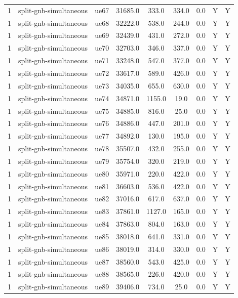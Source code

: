 \begin{table}[ht]
\begin{tabular}{|c|c|c|c|c|c|c|c|c|}
1 & split-gnb-simultaneous & ue67 & 31685.0 & 333.0 & 334.0 & 0.0 & Y & Y \\
1 & split-gnb-simultaneous & ue68 & 32222.0 & 538.0 & 244.0 & 0.0 & Y & Y \\
1 & split-gnb-simultaneous & ue69 & 32439.0 & 431.0 & 272.0 & 0.0 & Y & Y \\
1 & split-gnb-simultaneous & ue70 & 32703.0 & 346.0 & 337.0 & 0.0 & Y & Y \\
1 & split-gnb-simultaneous & ue71 & 33248.0 & 547.0 & 377.0 & 0.0 & Y & Y \\
1 & split-gnb-simultaneous & ue72 & 33617.0 & 589.0 & 426.0 & 0.0 & Y & Y \\
1 & split-gnb-simultaneous & ue73 & 34035.0 & 655.0 & 630.0 & 0.0 & Y & Y \\
1 & split-gnb-simultaneous & ue74 & 34871.0 & 1155.0 & 19.0 & 0.0 & Y & Y \\
1 & split-gnb-simultaneous & ue75 & 34885.0 & 816.0 & 25.0 & 0.0 & Y & Y \\
1 & split-gnb-simultaneous & ue76 & 34886.0 & 447.0 & 201.0 & 0.0 & Y & Y \\
1 & split-gnb-simultaneous & ue77 & 34892.0 & 130.0 & 195.0 & 0.0 & Y & Y \\
1 & split-gnb-simultaneous & ue78 & 35507.0 & 432.0 & 255.0 & 0.0 & Y & Y \\
1 & split-gnb-simultaneous & ue79 & 35754.0 & 320.0 & 219.0 & 0.0 & Y & Y \\
1 & split-gnb-simultaneous & ue80 & 35971.0 & 220.0 & 422.0 & 0.0 & Y & Y \\
1 & split-gnb-simultaneous & ue81 & 36603.0 & 536.0 & 422.0 & 0.0 & Y & Y \\
1 & split-gnb-simultaneous & ue82 & 37016.0 & 617.0 & 637.0 & 0.0 & Y & Y \\
1 & split-gnb-simultaneous & ue83 & 37861.0 & 1127.0 & 165.0 & 0.0 & Y & Y \\
1 & split-gnb-simultaneous & ue84 & 37863.0 & 804.0 & 163.0 & 0.0 & Y & Y \\
1 & split-gnb-simultaneous & ue85 & 38018.0 & 641.0 & 331.0 & 0.0 & Y & Y \\
1 & split-gnb-simultaneous & ue86 & 38019.0 & 314.0 & 330.0 & 0.0 & Y & Y \\
1 & split-gnb-simultaneous & ue87 & 38560.0 & 543.0 & 425.0 & 0.0 & Y & Y \\
1 & split-gnb-simultaneous & ue88 & 38565.0 & 226.0 & 420.0 & 0.0 & Y & Y \\
1 & split-gnb-simultaneous & ue89 & 39406.0 & 734.0 & 25.0 & 0.0 & Y & Y \\

\end{tabular}
\end{table}
